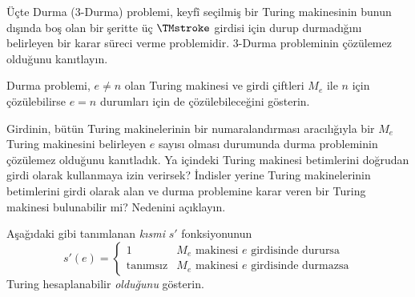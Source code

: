 \documentclass[../../../include/open-logic-section]{subfiles}
\begin{document}
\begin{prob}
Üçte Durma (3-Durma) problemi, keyfî seçilmiş bir Turing makinesinin bunun
dışında boş olan bir şeritte üç $\TMstroke$ girdisi için durup durmadığını
belirleyen bir karar süreci verme problemidir. 3-Durma probleminin çözülemez
olduğunu kanıtlayın.
\end{prob}

\begin{prob}
Durma problemi, $e\neq n$ olan Turing makinesi ve girdi çiftleri $M_e$ ile
$n$ için çözülebilirse $e=n$ durumları için de çözülebileceğini gösterin.
\end{prob}

\begin{prob}
Girdinin, bütün Turing makinelerinin bir numaralandırması aracılığıyla bir
$M_e$ Turing makinesini belirleyen $e$ sayısı olması durumunda durma
probleminin çözülemez olduğunu kanıtladık. Ya
 içindeki Turing makinesi betimlerini doğrudan
girdi olarak kullanmaya izin verirsek? İndisler yerine Turing makinelerinin
betimlerini girdi olarak alan ve durma problemine karar veren bir Turing
makinesi bulunabilir mi? Nedenini açıklayın.
\end{prob}

\begin{prob} Aşağıdaki gibi tanımlanan \emph{kısmi} $s'$ fonksiyonunun
  \[
  s'(e) =
  \begin{cases}
    \text{1} & \text{$M_e$ makinesi $e$ girdisinde durursa}\\
    \text{tanımsız} & \text{$M_e$ makinesi $e$ girdisinde durmazsa}
  \end{cases}
  \]
  Turing hesaplanabilir \emph{olduğunu} gösterin.
\end{prob}
\end{document}
